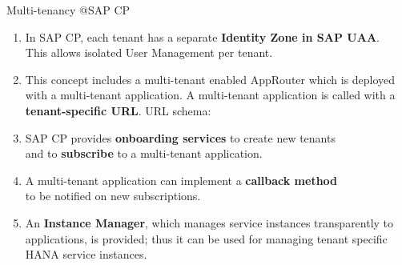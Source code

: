 \begin{frame}[t]{Multi-tenancy @SAP CP}
\small
\begin{enumerate}[<+->]
\item In SAP CP, each tenant has a separate \textbf{Identity Zone in SAP UAA}.
\\This allows isolated User Management per tenant. 
\item This concept includes a multi-tenant enabled AppRouter which is deployed with a multi-tenant application. 
A multi-tenant application is called with a \textbf{tenant-specific URL}. URL schema: 
\item SAP CP provides \textbf{onboarding services} to create new tenants
\\and to \textbf{subscribe} to a multi-tenant application. 
\item A multi-tenant application can implement a \textbf{callback method} 
\\to be notified on new subscriptions.
\item An \textbf{Instance Manager}, which manages service instances transparently to applications, is provided; thus it can be used for managing tenant specific HANA service instances.
\end{enumerate}
\end{frame}

